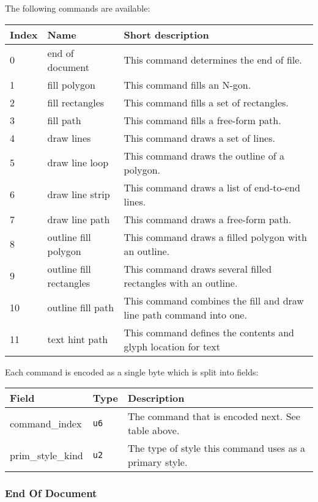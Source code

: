 \documentclass[]{article}
\begin{document}
The following commands are available:

\begin{longtable}[]{@{}p{0.5in}p{1.25in}p{4.25in}@{}}
\toprule
Index & Name & Short description \\
\midrule
\endhead
0 & end of document & This command determines the end of file. \\
1 & fill polygon & This command fills an N-gon. \\
2 & fill rectangles & This command fills a set of rectangles. \\
3 & fill path & This command fills a free-form path. \\
4 & draw lines & This command draws a set of lines. \\
5 & draw line loop & This command draws the outline of a polygon. \\
6 & draw line strip & This command draws a list of end-to-end lines. \\
7 & draw line path & This command draws a free-form path. \\
8 & outline fill polygon & This command draws a filled polygon with an outline. \\
9 & outline fill rectangles & This command draws several filled rectangles with an outline. \\
10 & outline fill path & This command combines the fill and draw line path command into one. \\
11 & text hint path & This command defines the contents and glyph location for text \\
\bottomrule
\end{longtable}

Each command is encoded as a single byte which is split into fields:

\begin{longtable}[]{@{}p{1.5in}p{0.5in}p{4in}@{}}
\toprule
Field & Type & Description \\
\midrule
\endhead
command\_index    & \texttt{u6} & The command that is encoded next. See table above. \\
prim\_style\_kind & \texttt{u2} & The type of style this command uses as a primary style. \\
\bottomrule
\end{longtable}

\hypertarget{end-of-document}{\subsubsection{End Of Document}\label{end-of-document}}
\end{document}
